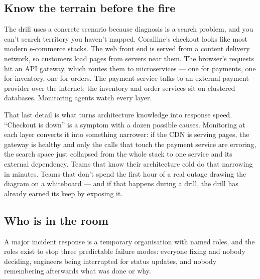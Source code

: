 \subsection{Know the terrain before the fire}


The drill uses a concrete scenario because diagnosis is a search problem, and you can't search territory you haven't mapped. Coralline's checkout looks like most modern e-commerce stacks. The web front end is served from a content delivery network, so customers load pages from servers near them. The browser's requests hit an API gateway, which routes them to microservices — one for payments, one for inventory, one for orders. The payment service talks to an external payment provider over the internet; the inventory and order services sit on clustered databases. Monitoring agents watch every layer.


That last detail is what turns architecture knowledge into response speed. ``Checkout is down'' is a symptom with a dozen possible causes. Monitoring at each layer converts it into something narrower: if the CDN is serving pages, the gateway is healthy and only the calls that touch the payment service are erroring, the search space just collapsed from the whole stack to one service and its external dependency. Teams that know their architecture cold do that narrowing in minutes. Teams that don't spend the first hour of a real outage drawing the diagram on a whiteboard — and if that happens during a drill, the drill has already earned its keep by exposing it.



\subsection{Who is in the room}


A major incident response is a temporary organisation with named roles, and the roles exist to stop three predictable failure modes: everyone fixing and nobody deciding, engineers being interrupted for status updates, and nobody remembering afterwards what was done or why.


